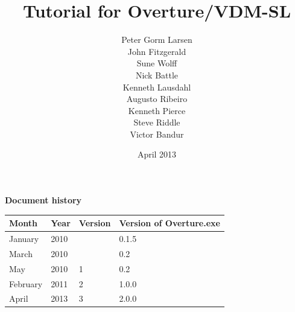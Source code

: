 \documentclass{overturerepsec}
\begin{document}
 
\title{Tutorial for Overture/VDM-SL}
\author{Peter Gorm Larsen\\
        John Fitzgerald \\
        Sune Wolff\\
        Nick Battle\\
        Kenneth Lausdahl\\
        Augusto Ribeiro\\
        Kenneth Pierce\\
        Steve Riddle\\
        Victor Bandur}

\date{April 2013}

{}     

\maketitle

{\textbf{Document history}}

\begin{tabular}{|l|l|l|l|}\hline
Month   & Year & Version & Version of Overture.exe \\ \hline
January & 2010 &  & 0.1.5 \\ \hline
March   & 2010 &  & 0.2   \\ \hline
May     & 2010 & 1& 0.2   \\ \hline
February& 2011 & 2& 1.0.0 \\ \hline
April   & 2013 & 3& 2.0.0 \\ \hline
\end{tabular}

\tableofcontents
\newpage
% 




\setcounter{page}{1}
\addtocounter{chapter}{2}



\appendix






\end{document}
